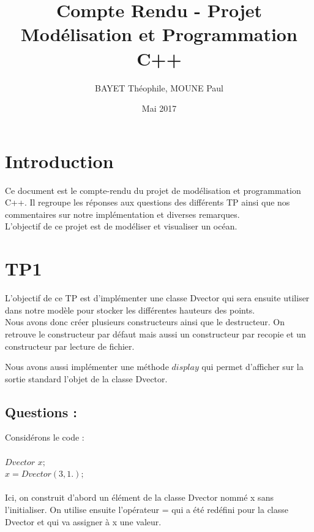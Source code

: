 \documentclass{article}
\title{Compte Rendu - Projet Modélisation et Programmation C++}
\author{BAYET Théophile, MOUNE Paul}
\date{Mai 2017}
\begin{document}
\maketitle

\vspace{1.5cm}

\tableofcontents

\newpage

\section{Introduction}

Ce document est le compte-rendu du projet de modélisation et programmation C++. Il regroupe les réponses aux questions des
différents TP ainsi que nos commentaires sur notre implémentation et diverses remarques. \\
L'objectif de ce projet est de modéliser et visualiser un océan.

\vspace{1cm}

\section{TP1}

L'objectif de ce TP est d'implémenter une classe Dvector qui sera ensuite utiliser dans notre modèle pour stocker les différentes hauteurs des points. \\

Nous avons donc créer plusieurs constructeurs ainsi que le destructeur. On retrouve le constructeur par défaut mais aussi un constructeur par recopie et un constructeur par lecture de fichier.

Nous avons aussi implémenter une méthode $display$ qui permet d'afficher sur la sortie standard l'objet de la classe Dvector.

\vspace{0.5cm}

\subsection{Questions :}

Considérons le code : \\ \\ $Dvector$ $x;$ \\ $x = Dvector(3, 1.);$ \\ \\

Ici, on construit d'abord un élément de la classe Dvector nommé x sans l'initialiser.
On utilise ensuite l'opérateur = qui a été redéfini pour la classe Dvector et qui va assigner à x une valeur.
\end{document}
